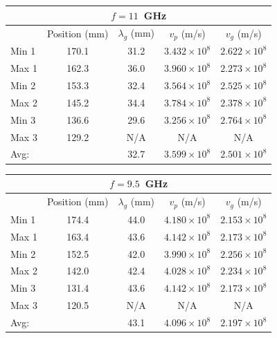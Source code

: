 \documentclass[11pt,letterpaper]{article}
\begin{document}
\begin{center}
\begin{tabular}{lcccc}
\toprule
\multicolumn{5}{c}{\textbf{$f = 11$~GHz}} \\
\midrule
 & Position (mm) & $\lambda_g$ (mm) & $v_p$ (m/s) & $v_g$ (m/s) \\
\midrule
Min 1     & 170.1 & 31.2 & $3.432\times10^{8}$ & $2.622\times10^{8}$ \\
Max 1     & 162.3 & 36.0 & $3.960\times10^{8}$ & $2.273\times10^{8}$ \\
Min 2     & 153.3 & 32.4 & $3.564\times10^{8}$ & $2.525\times10^{8}$ \\
Max 2     & 145.2 & 34.4 & $3.784\times10^{8}$ & $2.378\times10^{8}$ \\
Min 3     & 136.6 & 29.6 & $3.256\times10^{8}$ & $2.764\times10^{8}$ \\
Max 3     & 129.2 & N/A  & N/A                 & N/A                 \\
\midrule
Avg:      &       & 32.7 & $3.599\times10^{8}$ & $2.501\times10^{8}$ \\
\bottomrule
\end{tabular}
\end{center}

\begin{center}
\begin{tabular}{lcccc}
\toprule
\multicolumn{5}{c}{\textbf{$f = 9.5$~GHz}} \\
\midrule
 & Position (mm) & $\lambda_g$ (mm) & $v_p$ (m/s) & $v_g$ (m/s) \\
\midrule
Min 1     & 174.4 & 44.0 & $4.180\times10^{8}$ & $2.153\times10^{8}$ \\
Max 1     & 163.4 & 43.6 & $4.142\times10^{8}$ & $2.173\times10^{8}$ \\
Min 2     & 152.5 & 42.0 & $3.990\times10^{8}$ & $2.256\times10^{8}$ \\
Max 2     & 142.0 & 42.4 & $4.028\times10^{8}$ & $2.234\times10^{8}$ \\
Min 3     & 131.4 & 43.6 & $4.142\times10^{8}$ & $2.173\times10^{8}$ \\
Max 3     & 120.5 & N/A  & N/A                 & N/A                 \\
\midrule
Avg:      &       & 43.1 & $4.096\times10^{8}$ & $2.197\times10^{8}$ \\
\bottomrule
\end{tabular}
\end{center}
\end{document}
